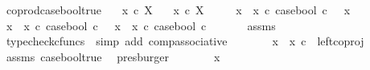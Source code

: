 \begin{isabellebody}
\ coprod{\isacharunderscore}{\kern0pt}case{\isacharunderscore}{\kern0pt}bool{\isacharunderscore}{\kern0pt}true{\isacharcolon}{\kern0pt}\isanewline
\ \ \ {\isachardoublequoteopen}x{}\ {\isasymin}\isactrlsub c\ X{\isachardoublequoteclose}\isanewline
\ \ \ {\isachardoublequoteopen}x{}\ {\isasymin}\isactrlsub c\ X{\isachardoublequoteclose}\isanewline
\ \ \ \ \ {\isachardoublequoteopen}{\isacharparenleft}{\kern0pt}x{}\ {\isasymamalg}\ x{}\ {\isasymcirc}\isactrlsub c\ case{\isacharunderscore}{\kern0pt}bool{\isacharparenright}{\kern0pt}\ {\isasymcirc}\isactrlsub c\ {\isasymt}\ {\isacharequal}{\kern0pt}\ x{}{\isachardoublequoteclose}\isanewline
%
\isadelimproof
%
\endisadelimproof
%
\isatagproof
{}\isamarkupfalse%
\ {\isacharminus}{\kern0pt}\ \isanewline
\ \ \isamarkupfalse%
\ {\isachardoublequoteopen}{\isacharparenleft}{\kern0pt}x{}\ {\isasymamalg}\ x{}\ {\isasymcirc}\isactrlsub c\ case{\isacharunderscore}{\kern0pt}bool{\isacharparenright}{\kern0pt}\ {\isasymcirc}\isactrlsub c\ {\isasymt}\ {\isacharequal}{\kern0pt}\ {\isacharparenleft}{\kern0pt}x{}\ {\isasymamalg}\ x{}{\isacharparenright}{\kern0pt}\ {\isasymcirc}\isactrlsub c\ case{\isacharunderscore}{\kern0pt}bool\ {\isasymcirc}\isactrlsub c\ {\isasymt}{\isachardoublequoteclose}\isanewline
\ \ \ \ \isamarkupfalse%
\ assms\ \isamarkupfalse%
\ {\isacharparenleft}{\kern0pt}typecheck{\isacharunderscore}{\kern0pt}cfuncs\ {\isacharcomma}{\kern0pt}\ simp\ add{\isacharcolon}{\kern0pt}\ comp{\isacharunderscore}{\kern0pt}associative{}{\isacharparenright}{\kern0pt}\isanewline
\ \ \isamarkupfalse%
\ \isamarkupfalse%
\ {\isachardoublequoteopen}{\isachardot}{\kern0pt}{\isachardot}{\kern0pt}{\isachardot}{\kern0pt}\ {\isacharequal}{\kern0pt}\ {\isacharparenleft}{\kern0pt}x{}\ {\isasymamalg}\ x{}{\isacharparenright}{\kern0pt}\ {\isasymcirc}\isactrlsub c\ \ left{\isacharunderscore}{\kern0pt}coproj\ {\isasymone}\ {\isasymone}{\isachardoublequoteclose}\isanewline
\ \ \ \ \isamarkupfalse%
\ assms\ case{\isacharunderscore}{\kern0pt}bool{\isacharunderscore}{\kern0pt}true\ \isamarkupfalse%
\ presburger\isanewline
\ \ \isamarkupfalse%
\ \isamarkupfalse%
\ {\isachardoublequoteopen}{\isachardot}{\kern0pt}{\isachardot}{\kern0pt}{\isachardot}{\kern0pt}\ {\isacharequal}{\kern0pt}\ x{}{\isachardoublequoteclose}\isanewline

\end{isabellebody}

